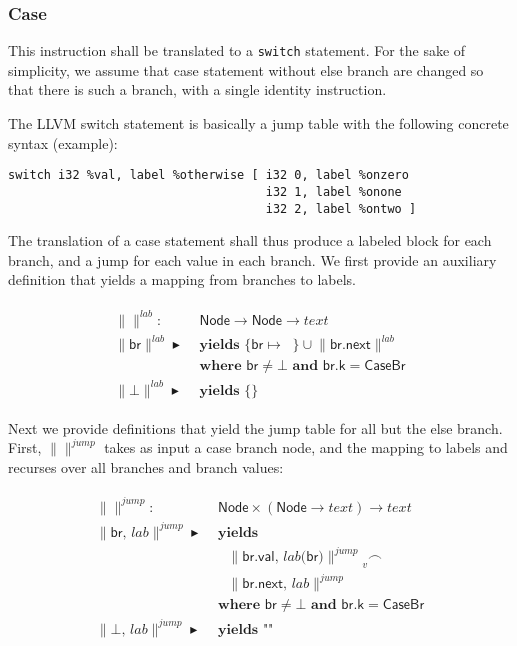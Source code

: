 \documentclass{article}
\newcommand{\trad}[2]{\ensuremath{\lVert \textsf{#1} \rVert^{\textit{#2}}}}
\DeclareMathOperator{\conc}{\smallfrown}
\DeclareMathOperator{\isdef}{\blacktriangleright}
\DeclareMathOperator{\name}{\mathcal{L}()}
\begin{document}
\subsubsection{Case}

This instruction shall be translated to a \verb'switch' statement.
For the sake of simplicity, we assume that case statement without
else branch are changed so that there is such a branch, with a single
identity instruction.

The LLVM switch statement is basically a jump table with the following
concrete syntax (example):
\begin{verbatim}
switch i32 %val, label %otherwise [ i32 0, label %onzero
                                    i32 1, label %onone
                                    i32 2, label %ontwo ]
\end{verbatim}

The translation of a case statement shall thus produce a labeled block
for each branch, and a jump for each value in each branch. We first
provide an auxiliary definition that yields a mapping from branches to
labels.
\begin{framed}
  \begin{align}
\begin{split}
    \trad{}{lab} : & \textsf{ Node} \rightarrow \textsf{Node} \rightarrow text \\
    \trad{br}{lab} \isdef 
    & \textbf{ yields } \{ \textsf{br} \mapsto  \name \} \cup
    \trad{br.next}{lab}  \\
    & \textbf{ where } \textsf{br} \ne \bot \textbf{ and } \textsf{br.k} = \textsf{CaseBr}  \\
    \trad{$\bot$}{lab} \isdef & \textbf{ yields } \{\} 
  \end{split}
\end{align}
\end{framed}

Next we provide definitions that yield the jump table for all
but the else branch. First, $\trad{}{jump}$ takes as input a
case branch node, and the mapping to labels and recurses over
all branches and branch values:
\begin{framed}
  \begin{align}
\begin{split}
    \trad{}{jump} : & \textsf{ Node} \times (\textsf{Node} \rightarrow text) \rightarrow text \\
    \trad{br, $lab$}{jump} \isdef
    & \textbf{ yields }  \\
    & \quad \trad{br.val, $lab($br$)$}{jump}_v \conc  \\
    & \quad \trad{br.next, $lab$}{jump}  \\
    & \textbf{ where } \textsf{br} \ne \bot \textbf{ and } \textsf{br.k} = \textsf{CaseBr}  \\
    \trad{$\bot$, $lab$}{jump} \isdef
    & \textbf{ yields } \texttt{""} 
  \end{split}
\end{align}
\end{framed}
\end{document}
